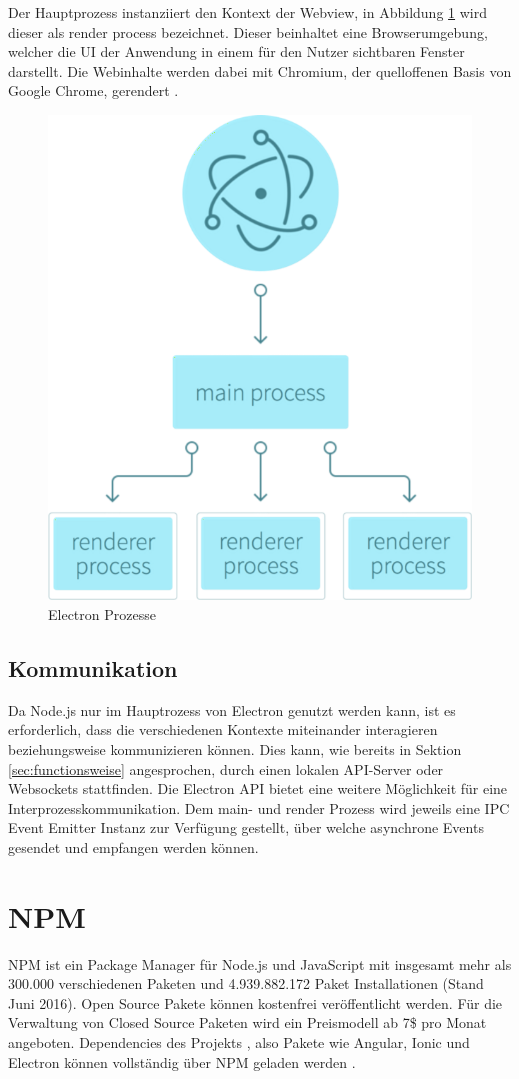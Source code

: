 Der Hauptprozess instanziiert den Kontext der Webview, in Abbildung \ref{fig:electronprozess} wird dieser als render process bezeichnet.
Dieser beinhaltet eine Browserumgebung, welcher die \ac{UI} der Anwendung in einem für den Nutzer sichtbaren Fenster darstellt.
Die Webinhalte werden dabei mit Chromium, der quelloffenen Basis von Google Chrome, gerendert \cite{Build58:online}.

\begin{figure}[htbp]
 \centering
 \includegraphics[width=0.4\linewidth]{kapitel3/electron-context.png}
 \caption{Electron Prozesse \cite{Build58:online}}
\label{fig:electronprozess}
\end{figure}


\subsection{Kommunikation}
\label{sec:Kommunikation}

Da Node.js nur im Hauptrozess von Electron genutzt werden kann, ist es erforderlich,
dass die verschiedenen Kontexte miteinander interagieren beziehungsweise kommunizieren können.
Dies kann, wie bereits in Sektion \ref{sec:functionsweise} angesprochen,
durch einen lokalen API-Server oder Websockets stattfinden.
Die Electron API bietet eine weitere Möglichkeit für eine Interprozesskommunikation.
Dem main- und render Prozess wird jeweils eine IPC Event Emitter Instanz zur Verfügung gestellt,
über welche asynchrone Events gesendet und empfangen werden können.

\section{\ac{NPM}}

\ac{NPM} ist ein Package Manager für Node.js und JavaScript mit insgesamt mehr als 300.000 verschiedenen Paketen und
4.939.882.172 Paket Installationen (Stand Juni 2016).
Open Source Pakete können kostenfrei veröffentlicht werden.
Für die Verwaltung von Closed Source Paketen wird ein Preismodell ab 7\$ pro Monat angeboten.
Dependencies des Projekts \projectname{}, also Pakete wie Angular, Ionic und Electron können vollständig
über \ac{NPM} geladen werden \cite{npm31:online}.

